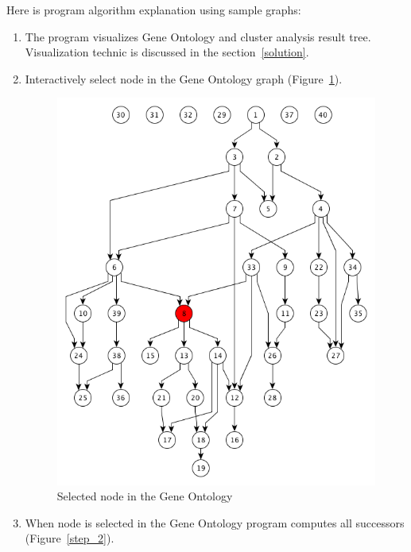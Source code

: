 \documentclass[a4paper,oneside]{article}
\begin{document}
Here is program algorithm explanation using sample graphs:
\begin{enumerate}
\item The program visualizes Gene Ontology and cluster analysis result tree. Visualization technic is discussed in the section~\ref{solution}.
\item Interactively select node in the Gene Ontology graph (Figure~\ref{step_1}).

\begin{figure}
	\begin{center}
		\includegraphics[scale=0.5]{subgraph_extraction_algorithm_step_1.png}
	\end{center}
	\caption{Selected node in the Gene Ontology}
	\label{step_1}
\end{figure}

\item When node is selected in the Gene Ontology program computes all successors (Figure~\ref{step_2}).


\end{enumerate}
\end{document}
